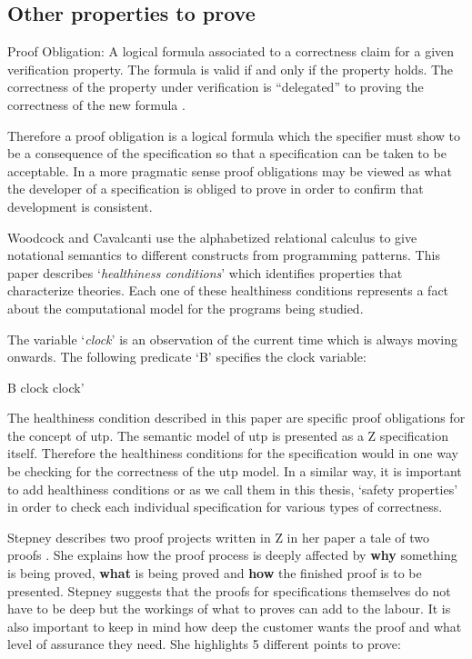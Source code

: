 \subsection{Other properties to prove}
\label{subsec:propertiestoprove}

\begin{defin}
Proof Obligation: A logical formula associated to a correctness claim for a given verification
property. The formula is valid if and only if the property holds. The
correctness of the property under verification is “delegated” to proving the
correctness of the new formula \cite{handbookofembed}.
\end{defin}

Therefore a proof obligation is a logical formula which the specifier must show
to be a consequence of the specification so that a specification can be taken to
be acceptable. In a more pragmatic sense proof obligations may be viewed as what
the developer of a specification is obliged to prove in order to confirm that
development is consistent.

Woodcock and Cavalcanti \cite{woodcock2004tutorial} use the alphabetized
relational calculus to give notational semantics to different constructs from
programming patterns. This paper describes `\emph{healthiness conditions}' which
identifies properties that characterize theories. Each one of these healthiness
conditions represents a fact about the computational model for the programs
being studied.

\begin{exam}
The variable `\emph{clock}' is an observation of the current time which is
always moving onwards. The following predicate `B' specifies the clock variable:

\begin{zed}
B  clock \leq clock'
\end{zed}
\end{exam}

The healthiness condition described in this paper are specific proof obligations
for the concept of \Gls{utp}. The semantic model of \gls{utp} is presented as a Z
specification itself. Therefore the healthiness conditions for the specification would
in one way be checking for the correctness of the \gls{utp} model. In a similar
way, it is important to add healthiness conditions or as we call them in this
thesis, `safety properties' in order to check each individual specification for
various types of correctness.

Stepney describes two proof projects written in Z in her paper a tale of two
proofs \cite{stepney1998tale}. She explains how the proof process is deeply
affected by \textbf{why} something is being proved, \textbf{what} is being
proved and \textbf{how} the finished proof is to be presented. Stepney suggests
that the proofs for specifications themselves do not have to be deep but the
workings of what to proves can add to the labour. It is also important to keep
in mind how deep the customer wants the proof and what level of assurance they
need. She highlights 5 different points to prove:

